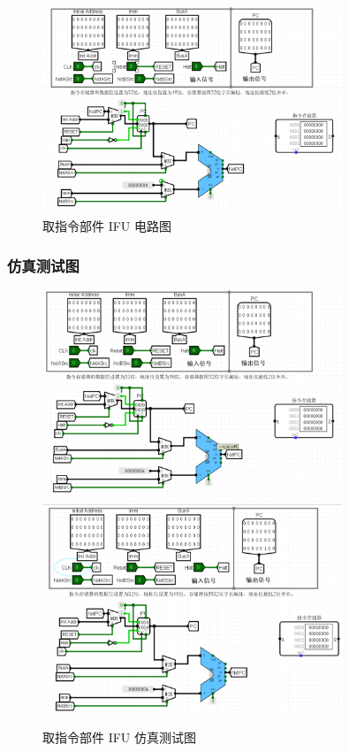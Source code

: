 \documentclass{article}
\begin{document}
    \begin{figure}[H]
    \centering
    \includegraphics[width=0.8\textwidth]{3.4.2.png}
    \caption{取指令部件 IFU 电路图}
    \end{figure}

    \subsubsection{仿真测试图}
    \begin{figure}[H]
    \centering
    \includegraphics[width=0.8\textwidth]{3.5.1.png}
    \includegraphics[width=0.8\textwidth]{3.5.2.png}
    \caption{取指令部件 IFU 仿真测试图}
    \end{figure}
    
\end{document}
